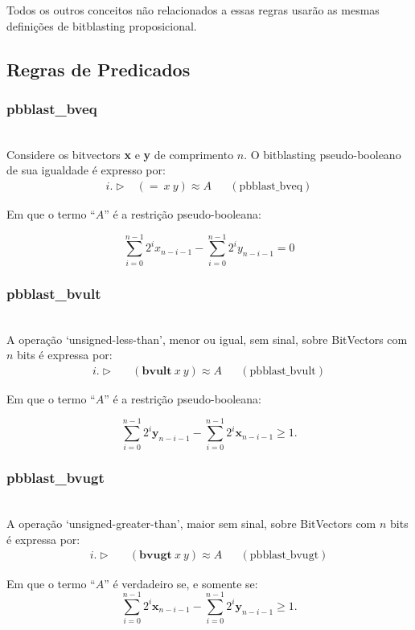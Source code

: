 \documentclass[conference]{IEEEtran}
\begin{document}
Todos os outros conceitos não relacionados a essas regras usarão as mesmas definições de bitblasting proposicional.

\subsection{Regras de Predicados}
\subsubsection{\textbf{pbblast\_bveq}}
\noindent\\
Considere os bitvectors \textbf{x} e \textbf{y} de comprimento $n$.
O bitblasting pseudo-booleano de sua igualdade é expresso por:
\begin{align*}
    i. \vartriangleright & (=\ x\ y) \approx A &  & (\text{pbblast\_bveq})
\end{align*}

Em que o termo ``$A$'' é a restrição pseudo-booleana:

\[ \sum_{i=0}^{n-1}{2^i x_{n-i-1}} - \sum_{i=0}^{n-1}{2^i y_{n-i-1}} = 0\]

\subsubsection{\textbf{pbblast\_bvult}}
\noindent\\
A operação `unsigned-less-than', menor ou igual, sem sinal, sobre BitVectors com $n$ bits é
expressa por:
\begin{align*}
    i. \vartriangleright &  & (\textbf{bvult}\ x\ y) \approx A &  & (\text{pbblast\_bvult})
\end{align*}

Em que o termo ``$A$'' é a restrição pseudo-booleana:

\[
    \sum_{i=0}^{n-1} 2^i\mathbf{y}_{n-i-1} - \sum_{i=0}^{n-1} 2^i\mathbf{x}_{n-i-1} \ge 1.
\]

\subsubsection{\textbf{pbblast\_bvugt}}
\noindent\\
A operação `unsigned-greater-than', maior sem sinal, sobre BitVectors com $n$ bits é expressa por:
\begin{align*}
    i. \vartriangleright &  & (\textbf{bvugt}\ x\ y) \approx A &  & (\text{pbblast\_bvugt})
\end{align*}

Em que o termo ``$A$'' é verdadeiro se, e somente se:
\[
    \sum_{i=0}^{n-1} 2^i\mathbf{x}_{n-i-1} - \sum_{i=0}^{n-1} 2^i\mathbf{y}_{n-i-1} \ge 1.
\]
\end{document}
